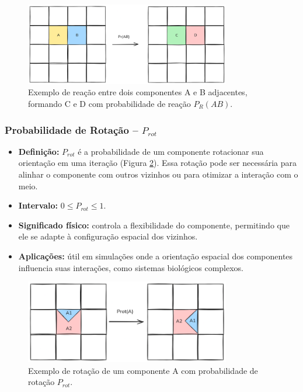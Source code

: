 \documentclass[12pt,oneside]{report}
\begin{document}
\begin{figure}[H]
    \centering
    \includegraphics[width=0.8\textwidth]{img/reacao.png}
    \caption{\small Exemplo de reação entre dois componentes A e B adjacentes, formando C e D com probabilidade de reação $P_R(AB)$.}
    \label{fig:reacao}
\end{figure}

\subsubsection{Probabilidade de Rotação – \texorpdfstring{$P_{rot}$}{Prot}}
\label{subsubsec:Prot}

\begin{itemize}
    \item \textbf{Definição:} $P_{rot}$ é a probabilidade de um componente rotacionar sua orientação em uma iteração (Figura \ref{fig:rotacao}). Essa rotação pode ser necessária para alinhar o componente com outros vizinhos ou para otimizar a interação com o meio.
    \item \textbf{Intervalo:} $0 \le P_{rot} \le 1$.
    \item \textbf{Significado físico:} controla a flexibilidade do componente, permitindo que ele se adapte à configuração espacial dos vizinhos.
    \item \textbf{Aplicações:} útil em simulações onde a orientação espacial dos componentes influencia suas interações, como sistemas biológicos complexos.
\end{itemize}

\begin{figure}[H]
    \centering
    \includegraphics[width=0.8\textwidth]{img/rotacao.png}
    \caption{\small Exemplo de rotação de um componente A com probabilidade de rotação $P_{rot}$.}
    \label{fig:rotacao}
\end{figure}
\end{document}
